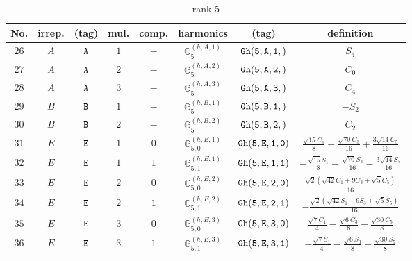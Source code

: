 \documentclass[fleqn,8pt]{jsarticle}
\begin{document}
\begin{table}[ht!]
\begin{center}
\caption{rank 5}
\renewcommand{\arraystretch}{1.3}
\begin{tabular}{cccccccc} \hline \hline
No. & irrep. & (tag) & mul. & comp. & harmonics & (tag) & definition \\ \hline
$ 26 $ & $ A $ & $ {\tt A} $ & $ 1 $ & $ - $ & $ \mathbb{G}_{5}^{(h,A,1)} $ & $ {\tt Gh(5,A,1,)} $ & $ S_{4} $ \\
$ 27 $ & $ A $ & $ {\tt A} $ & $ 2 $ & $ - $ & $ \mathbb{G}_{5}^{(h,A,2)} $ & $ {\tt Gh(5,A,2,)} $ & $ C_{0} $ \\
$ 28 $ & $ A $ & $ {\tt A} $ & $ 3 $ & $ - $ & $ \mathbb{G}_{5}^{(h,A,3)} $ & $ {\tt Gh(5,A,3,)} $ & $ C_{4} $ \\
$ 29 $ & $ B $ & $ {\tt B} $ & $ 1 $ & $ - $ & $ \mathbb{G}_{5}^{(h,B,1)} $ & $ {\tt Gh(5,B,1,)} $ & $ - S_{2} $ \\
$ 30 $ & $ B $ & $ {\tt B} $ & $ 2 $ & $ - $ & $ \mathbb{G}_{5}^{(h,B,2)} $ & $ {\tt Gh(5,B,2,)} $ & $ C_{2} $ \\
$ 31 $ & $ E $ & $ {\tt E} $ & $ 1 $ & $ 0 $ & $ \mathbb{G}_{5,0}^{(h,E,1)} $ & $ {\tt Gh(5,E,1,0)} $ & $ \frac{\sqrt{15} C_{1}}{8} - \frac{\sqrt{70} C_{3}}{16} + \frac{3 \sqrt{14} C_{5}}{16} $ \\
$ 32 $ & $ E $ & $ {\tt E} $ & $ 1 $ & $ 1 $ & $ \mathbb{G}_{5,1}^{(h,E,1)} $ & $ {\tt Gh(5,E,1,1)} $ & $ - \frac{\sqrt{15} S_{1}}{8} - \frac{\sqrt{70} S_{3}}{16} - \frac{3 \sqrt{14} S_{5}}{16} $ \\
$ 33 $ & $ E $ & $ {\tt E} $ & $ 2 $ & $ 0 $ & $ \mathbb{G}_{5,0}^{(h,E,2)} $ & $ {\tt Gh(5,E,2,0)} $ & $ \frac{\sqrt{2} \left(\sqrt{42} C_{1} + 9 C_{3} + \sqrt{5} C_{5}\right)}{16} $ \\
$ 34 $ & $ E $ & $ {\tt E} $ & $ 2 $ & $ 1 $ & $ \mathbb{G}_{5,1}^{(h,E,2)} $ & $ {\tt Gh(5,E,2,1)} $ & $ - \frac{\sqrt{2} \left(\sqrt{42} S_{1} - 9 S_{3} + \sqrt{5} S_{5}\right)}{16} $ \\
$ 35 $ & $ E $ & $ {\tt E} $ & $ 3 $ & $ 0 $ & $ \mathbb{G}_{5,0}^{(h,E,3)} $ & $ {\tt Gh(5,E,3,0)} $ & $ \frac{\sqrt{7} C_{1}}{4} - \frac{\sqrt{6} C_{3}}{8} - \frac{\sqrt{30} C_{5}}{8} $ \\
$ 36 $ & $ E $ & $ {\tt E} $ & $ 3 $ & $ 1 $ & $ \mathbb{G}_{5,1}^{(h,E,3)} $ & $ {\tt Gh(5,E,3,1)} $ & $ - \frac{\sqrt{7} S_{1}}{4} - \frac{\sqrt{6} S_{3}}{8} + \frac{\sqrt{30} S_{5}}{8} $ \\
 \hline \hline
\end{tabular}
\end{center}
\end{table}
\end{document}
